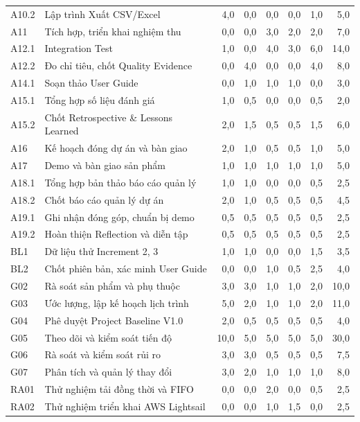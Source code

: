 \begin{longtable}{@{}lp{.30\linewidth}*{6}{r}@{}}
A10.2 & Lập trình Xuất CSV/Excel & 4,0 & 0,0 & 0,0 & 0,0 & 1,0 & 5,0 \\
A11 & Tích hợp, triển khai nghiệm thu & 0,0 & 0,0 & 3,0 & 2,0 & 2,0 & 7,0 \\
A12.1 & Integration Test & 1,0 & 0,0 & 4,0 & 3,0 & 6,0 & 14,0 \\
A12.2 & Đo chỉ tiêu, chốt Quality Evidence & 0,0 & 4,0 & 0,0 & 0,0 & 4,0 & 8,0 \\
A14.1 & Soạn thảo User Guide & 0,0 & 1,0 & 1,0 & 1,0 & 0,0 & 3,0 \\
A15.1 & Tổng hợp số liệu đánh giá & 1,0 & 0,5 & 0,0 & 0,0 & 0,5 & 2,0 \\
A15.2 & Chốt Retrospective \& Lessons Learned & 2,0 & 1,5 & 0,5 & 0,5 & 1,5 & 6,0 \\
A16 & Kế hoạch đóng dự án và bàn giao & 2,0 & 1,0 & 0,5 & 0,5 & 1,0 & 5,0 \\
A17 & Demo và bàn giao sản phẩm & 1,0 & 1,0 & 1,0 & 1,0 & 1,0 & 5,0 \\
A18.1 & Tổng hợp bản thảo báo cáo quản lý & 1,0 & 1,0 & 0,0 & 0,0 & 0,5 & 2,5 \\
A18.2 & Chốt báo cáo quản lý dự án & 2,0 & 1,0 & 0,5 & 0,5 & 0,5 & 4,5 \\
A19.1 & Ghi nhận đóng góp, chuẩn bị demo & 0,5 & 0,5 & 0,5 & 0,5 & 0,5 & 2,5 \\
A19.2 & Hoàn thiện Reflection và diễn tập & 0,5 & 0,5 & 0,5 & 0,5 & 0,5 & 2,5 \\
BL1 & Dữ liệu thử Increment 2, 3 & 1,0 & 1,0 & 0,0 & 0,0 & 1,5 & 3,5 \\
BL2 & Chốt phiên bản, xác minh User Guide & 0,0 & 0,0 & 1,0 & 0,5 & 2,5 & 4,0 \\
G02 & Rà soát sản phẩm và phụ thuộc & 3,0 & 3,0 & 1,0 & 1,0 & 2,0 & 10,0 \\
G03 & Ước lượng, lập kế hoạch lịch trình & 5,0 & 2,0 & 1,0 & 1,0 & 2,0 & 11,0 \\
G04 & Phê duyệt Project Baseline V1.0 & 2,0 & 0,5 & 0,5 & 0,5 & 0,5 & 4,0 \\
G05 & Theo dõi và kiểm soát tiến độ & 10,0 & 5,0 & 5,0 & 5,0 & 5,0 & 30,0 \\
G06 & Rà soát và kiểm soát rủi ro & 3,0 & 3,0 & 0,5 & 0,5 & 0,5 & 7,5 \\
G07 & Phân tích và quản lý thay đổi & 3,0 & 2,0 & 1,0 & 1,0 & 1,0 & 8,0 \\
RA01 & Thử nghiệm tải đồng thời và FIFO & 0,0 & 0,0 & 2,0 & 0,0 & 0,5 & 2,5 \\
RA02 & Thử nghiệm triển khai AWS Lightsail & 0,0 & 0,0 & 1,0 & 1,5 & 0,0 & 2,5 \\

\end{longtable}
